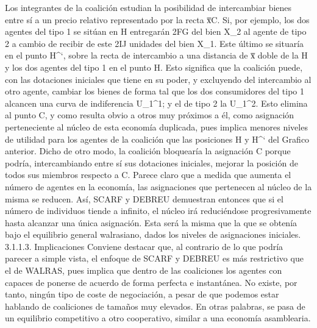 \documentclass[10pt,a4paper]{article}
\begin{document}
Los integrantes de la coalición estudian la posibilidad de intercambiar bienes entre sí a un precio relativo representado por la recta x̅C. 
Si, por ejemplo, los dos agentes del tipo 1 se sitúan en H entregarán 2FG del bien X_2 al agente de tipo 2 a cambio de recibir de este 2IJ unidades del bien X_1. Este último se situaría en el punto H^‘, sobre la recta de intercambio a una distancia de x̅ doble de la H y los dos agentes del tipo 1 en el punto H.
Esto significa que la coalición puede, con las dotaciones iniciales que tiene en su poder, y excluyendo del intercambio al otro agente, cambiar los bienes de forma tal que los dos consumidores del tipo 1 alcancen una curva de indiferencia U_1^1; y el de tipo 2 la U_1^2. Esto elimina al punto C, y como resulta obvio a otros muy próximos a él, como asignación perteneciente al núcleo de esta economía duplicada, pues implica menores niveles de utilidad para los agentes de la coalición que las posiciones H y H^‘ del Grafico anterior. Dicho de otro modo, la coalición bloquearía la asignación C porque podría, intercambiando entre sí sus dotaciones iniciales, mejorar la posición de todos sus miembros respecto a C.
Parece claro que a medida que aumenta el número de agentes en la economía, las asignaciones que pertenecen al núcleo de la misma se reducen. Así, SCARF y DEBREU demuestran entonces que si el número de individuos tiende a infinito, el núcleo irá reduciéndose progresivamente hasta alcanzar una única asignación. Esta será la misma que la que se obtenía bajo el equilibrio general walrasiano, dados los niveles de asignaciones iniciales.
3.1.1.3. Implicaciones
Conviene destacar que, al contrario de lo que podría parecer a simple vista, el enfoque de SCARF y DEBREU es más restrictivo que el de WALRAS, pues implica que dentro de las coaliciones los agentes con capaces de ponerse de acuerdo de forma perfecta e instantánea. No existe, por tanto, ningún tipo de coste de negociación,   a pesar de que podemos estar hablando de coaliciones de tamaños muy elevados. En otras palabras, se pasa de un equilibrio competitivo a otro cooperativo, similar a una economía asamblearia. 
\end{document}
